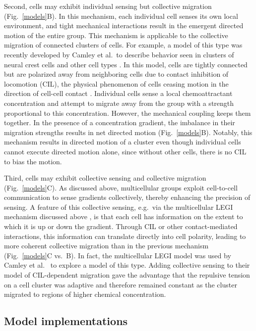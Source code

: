 Second, cells may exhibit individual sensing but collective migration (Fig.\ \ref{models}B). In this mechanism, each individual cell senses its own local environment, and tight mechanical interactions result in the emergent directed motion of the entire group. This mechanism is applicable to the collective migration of connected clusters of cells. For example, a model of this type was recently developed by Camley et al.\ to describe behavior seen in clusters of neural crest cells and other cell types \cite{camley2016emergent}. In this model, cells are tightly connected but are polarized away from neighboring cells due to contact inhibition of locomotion (CIL), the physical phenomenon of cells ceasing motion in the direction of cell-cell contact \cite{mayor2010keeping}. Individual cells sense a local chemoattractant concentration and attempt to migrate away from the group with a strength proportional to this concentration. However, the mechanical coupling keeps them together. In the presence of a concentration gradient, the imbalance in their migration strengths results in net directed motion (Fig.\ \ref{models}B). Notably, this mechanism results in directed motion of a cluster even though individual cells cannot execute directed motion alone, since without other cells, there is no CIL to bias the motion.

Third, cells may exhibit collective sensing and collective migration (Fig.\ \ref{models}C). As discussed above, multicellular groups exploit cell-to-cell communication to sense gradients collectively, thereby enhancing the precision of sensing. A feature of this collective sensing, e.g.\ via the multicellular LEGI mechanism discussed above \cite{ellison2016cell, mugler2016limits}, is that each cell has information on the extent to which it is up or down the gradient. Through CIL or other contact-mediated interactions, this information can translate directly into cell polarity, leading to more coherent collective migration than in the previous mechanism (Fig.\ \ref{models}C vs.\ B). In fact, the multicellular LEGI model was used by Camley et al.\ \cite{camley2016emergent} to explore a model of this type. Adding collective sensing to their model of CIL-dependent migration gave the advantage that the repulsive tension on a cell cluster was adaptive and therefore remained constant as the cluster migrated to regions of higher chemical concentration.

\subsection{Model implementations}

